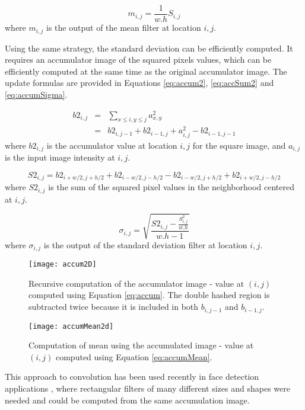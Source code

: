 \documentclass{InsightArticle}
\begin{document}
\begin{equation}
\label{eq:accumMean}
m_{i,j} = \frac{1}{w.h}S_{i,j}
\end{equation}
where $m_{i,j}$ is the output of the mean filter at location $i,j$.

Using the same strategy, the standard deviation can be efficiently
computed.  It requires an accumulator image of the squared pixels
values, which can be efficiently computed at the same time as the
original accumulator image. The update formulas are provided in
Equations \ref{eq:accum2}, \ref{eq:accSum2} and \ref{eq:accumSigma}.

\begin{eqnarray}
\label{eq:accum2}
b2_{i,j} & = & \sum_{x \leq i, y \leq j} a_{x,y}^2 \\ \nonumber
	& = & b2_{i,j-1} + b2_{i-1, j} + a_{i,j}^2 - b2_{i-1, j-1}
\end{eqnarray}
where $b2_{i,j}$ is the accumulator value at location $i,j$ for the square image, and $a_{i,j}$ is the input image intensity at $i,j$.

\begin{equation}
\label{eq:accSum2}
S2_{i,j} = b2_{i+w/2,j+h/2} + b2_{i-w/2,j-h/2} - b2_{i-w/2,j+h/2} + b2_{i+w/2,j-h/2}
\end{equation}
where $S2_{i,j}$ is the sum of the squared pixel values in the neighborhood centered at $i,j$.

\begin{equation}
\label{eq:accumSigma}
\sigma_{i,j} = \sqrt{\frac{S2_{i,j} - \frac{S_{i,j}^2}{w.h}}{w.h-1}}
\end{equation}
where $\sigma_{i,j}$ is the output of the standard deviation filter at location $i,j$.

\begin{figure}[htbp]
\centering
\texttt{[image: accum2D]}
\caption{Recursive computation of the accumulator image - value at $(i,j)$ computed using Equation \ref{eq:accum}. The double hashed region is subtracted twice because it is included in both $b_{i,j-1}$ and $b_{i-1, j}$.\label{fig:accum}}
\end{figure}

\begin{figure}[htbp]
\centering
\texttt{[image: accumMean2d]}
\caption{Computation of mean using the accumulated image - value at $(i,j)$ computed using Equation \ref{eq:accumMean}.\label{fig:accumMean}}
\end{figure}

This approach to convolution has been used recently in face detection
applications \cite{Viola2004}, where rectangular filters of many
different sizes and shapes were needed and could be computed from the same accumulation image.
\end{document}
